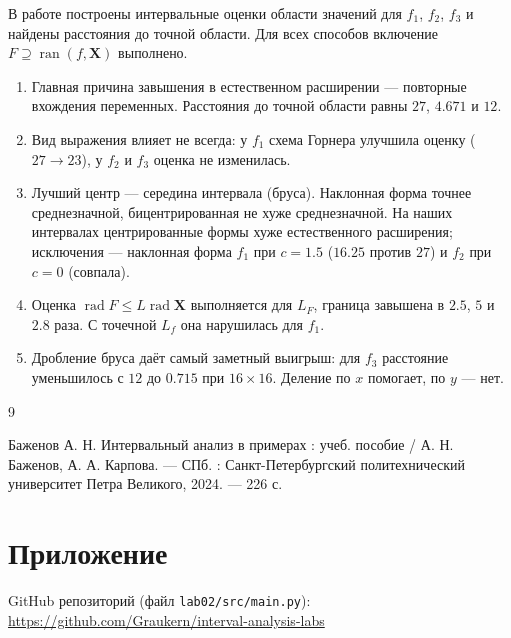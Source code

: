 \documentclass[a4paper, 14pt]{extarticle}
\begin{document}
В работе построены интервальные оценки области значений для $f_1$, $f_2$, $f_3$ и найдены расстояния до точной области. Для всех способов включение $F \supseteq \operatorname{ran}(f, \mathbf{X})$ выполнено.

\begin{enumerate}
    \item Главная причина завышения в естественном расширении --- повторные вхождения переменных. Расстояния до точной области равны $27$, $4.671$ и $12$.
    \item Вид выражения влияет не всегда: у $f_1$ схема Горнера улучшила оценку ($27 \to 23$), у $f_2$ и $f_3$ оценка не изменилась.
    \item Лучший центр --- середина интервала (бруса). Наклонная форма точнее среднезначной, бицентрированная не хуже среднезначной. На наших интервалах центрированные формы хуже естественного расширения; исключения --- наклонная форма $f_1$ при $c = 1.5$ ($16.25$ против $27$) и $f_2$ при $c = 0$ (совпала).
    \item Оценка $\operatorname{rad}F \le L\operatorname{rad}\mathbf{X}$ выполняется для $L_F$, граница завышена в $2.5$, $5$ и $2.8$ раза. С точечной $L_f$ она нарушилась для $f_1$.
    \item Дробление бруса даёт самый заметный выигрыш: для $f_3$ расстояние уменьшилось с $12$ до $0.715$ при $16\times16$. Деление по $x$ помогает, по $y$ --- нет.
\end{enumerate}

\renewcommand{\refname}{\thesection\ Список литературы}

\begin{thebibliography}{9}

    Баженов А. Н. Интервальный анализ в примерах : учеб. пособие / А. Н. Баженов, А. А. Карпова. --- СПб. : Санкт-Петербургский политехнический университет Петра Великого, 2024. --- 226 с.

\end{thebibliography}

\section{Приложение}

GitHub репозиторий (файл \texttt{lab02/src/main.py}): \\
\url{https://github.com/Graukern/interval-analysis-labs}
 
\end{document}
